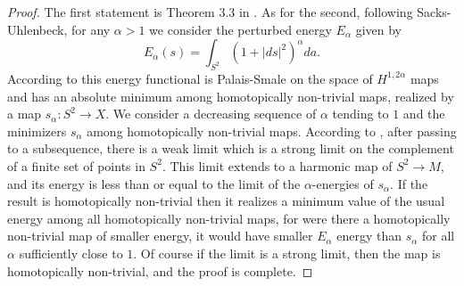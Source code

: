 \begin{proof}
The first statement is Theorem 3.3 in \cite{SacksUhlenbeck}. As for
the second, following Sacks-Uhlenbeck, for any $\alpha>1$ we
consider the perturbed energy $E_\alpha$ given by
$$E_\alpha(s)=\int_{S^2}\left(1+|ds|^2\right)^\alpha da.$$
 According to
\cite{SacksUhlenbeck} this energy functional is Palais-Smale on the
space of $H^{1,2\alpha}$ maps and has an absolute minimum among
homotopically non-trivial maps, realized by a map $s_\alpha\colon
S^2\to X$. We consider a decreasing sequence of $\alpha$ tending to
$1$ and the minimizers $s_\alpha$ among homotopically non-trivial
maps. According to \cite{SacksUhlenbeck}, after passing to a
subsequence, there is a weak limit which is a strong limit on the
complement of a finite set of points in $S^2$. This limit extends to
a harmonic map of $S^2\to M$, and its energy is less than or equal
to the limit of the $\alpha$-energies of $s_\alpha$. If the result
is homotopically non-trivial then it realizes a minimum value of the
usual energy among all homotopically non-trivial maps, for were
there a homotopically non-trivial map of smaller energy, it would
have smaller $E_\alpha$ energy than $s_\alpha$ for all $\alpha$
sufficiently close to $1$. Of course if the limit is a strong limit,
then the map is homotopically non-trivial, and the proof is
complete.


\end{proof}
